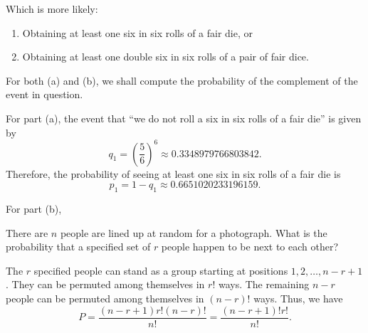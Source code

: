 \begin{problem}[Handout 1, \# 12]
  Which is more likely:
  \begin{enumerate}[label=(\alph*),noitemsep]
  \item Obtaining at least one six in six rolls of a fair die, or
  \item Obtaining at least one double six in six rolls of a pair of fair
    dice.
  \end{enumerate}
\end{problem}
\begin{solution*}
  For both (a) and (b), we shall compute the probability of the complement
  of the event in question.

  For part (a), the event that ``we do not roll a six in six rolls of a
  fair die'' is given by
  \[
    q_1=\left(\frac{5}{6}\right)^6\approx\num{0.3348979766803842}.
  \]
  Therefore, the probability of seeing at least one six in six rolls of a
  fair die is
  \begin{equation}
    \label{eq:1:six-in-six-rolls}
    p_1=1-q_1\approx\num{0.6651020233196159}.
  \end{equation}

  For part (b),

\end{solution*}

\begin{problem}[Handout 1, \# 13]
  There are \(n\) people are lined up at random for a photograph. What is
  the probability that a specified set of \(r\) people happen to be next to
  each other?
\end{problem}
\begin{solution*}
  The \(r\) specified people can stand as a group starting at positions
  \(1,2,\dotsc,n-r+1\). They can be permuted among themselves in \(r!\)
  ways. The remaining \(n-r\) people can be permuted among themselves in
  \((n-r)!\) ways. Thus, we have
  \[
    P=\frac{(n-r+1)r!(n-r)!}{n!}=\frac{(n-r+1)!r!}{n!}.
  \]
\end{solution*}

